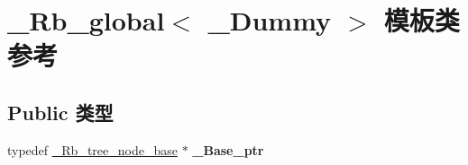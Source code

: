 \hypertarget{class___rb__global}{}\section{\+\_\+\+Rb\+\_\+global$<$ \+\_\+\+Dummy $>$ 模板类 参考}
\label{class___rb__global}
\subsection*{Public 类型}
\begin{DoxyCompactItemize}
\item 
\mbox{\label{class___rb__global_a03f79cda4ff33b87449ed63c7cdbf48f}} 
typedef \hyperlink{struct___rb__tree__node__base}{\+\_\+\+Rb\+\_\+tree\+\_\+node\+\_\+base} $\ast$ {\bfseries \+\_\+\+Base\+\_\+ptr}
\end{DoxyCompactItemize}
